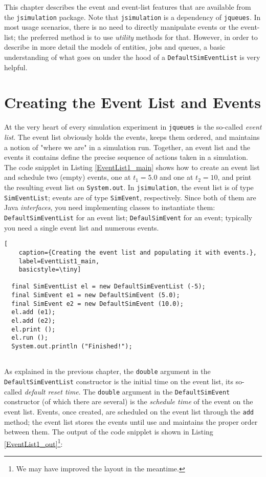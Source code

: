 This chapter describes the event and event-list features
  that are available from the \lstinline{jsimulation} package.
Note that \lstinline{jsimulation} is a dependency of \lstinline{jqueues}.
In most usage scenarios,
  there is no need to directly manipulate events or the event-list;
  the preferred method is to use {\em utility\/} methods for that.
However,
  in order to describe in more detail the models of
  entities, jobs and queues,
  a basic understanding of what goes on under the hood
  of a \lstinline|DefaultSimEventList|
  is very helpful.

\section{Creating the Event List and Events}

At the very heart of every simulation experiment
  in \lstinline{jqueues}
  is the so-called {\em event list}.
The event list obviously holds the events,
  keeps them ordered,
  and maintains a notion of "where we are" in a simulation run.
Together, an event list and the events it contains define
  the precise sequence of actions taken in a simulation.
The code snipplet in Listing \ref{EventList1_main}
  shows how to create an event list and
  schedule two (empty) events, one at $t_{1}=5.0$ and one at $t_{2}=10$,
  and print the resulting event list on \lstinline{System.out}.
In \lstinline{jsimulation},
  the event list is of type \lstinline{SimEventList};
  events are of type \lstinline{SimEvent},
  respectively.
Since both of them are Java {\em interfaces}, you need implementing classes
  to instantiate them: \lstinline{DefaultSimEventList} for an event list;
  \lstinline{DefaulSimEvent} for an event;
  typically you need a single event list and numerous events.
  
\begin{lstfloat}
\begin{lstlisting}[
    caption={Creating the event list and populating it with events.},
    label=EventList1_main,
    basicstyle=\tiny]
	
  final SimEventList el = new DefaultSimEventList (-5);
  final SimEvent e1 = new DefaultSimEvent (5.0);
  final SimEvent e2 = new DefaultSimEvent (10.0);
  el.add (e1);
  el.add (e2);
  el.print ();
  el.run ();
  System.out.println ("Finished!");
	
\end{lstlisting}
\end{lstfloat}

As explained in the previous chapter,
  the \lstinline|double| argument in the \lstinline|DefaultSimEventList|
  constructor is the initial time on the event list,
  its so-called {\em default reset time}.
The \lstinline{double} argument in the \lstinline{DefaultSimEvent} constructor
  (of which there are several)
  is the {\em schedule time\/} of the event on the event list.
Events, once created,
  are scheduled on the event list through the \lstinline|add| method;
  the event list stores the events until use
  and maintains the proper order between them.
The output of the code snipplet is shown in Listing \ref{EventList1_out}\footnote{
  We may have improved the layout in the meantime.}:

